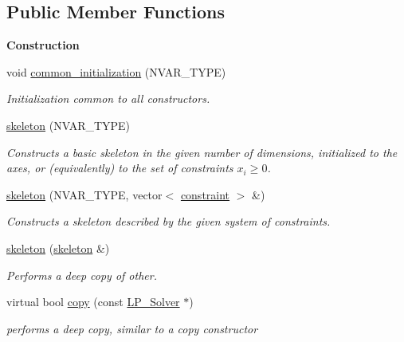 \subsection*{Public Member Functions}
\begin{Indent}\textbf{ Construction}\par
\begin{DoxyCompactItemize}
\item 
\mbox{\label{classskeleton_a7a9181253fc3b9f7b61871047b2b31cc}} 
void \hyperlink{classskeleton_a7a9181253fc3b9f7b61871047b2b31cc}{common\+\_\+initialization} (N\+V\+A\+R\+\_\+\+T\+Y\+PE)
\begin{DoxyCompactList}\small\item\em Initialization common to all constructors. \end{DoxyCompactList}\item 
\hyperlink{classskeleton_a60f5818e984abe589ea8298d189cd9c6}{skeleton} (N\+V\+A\+R\+\_\+\+T\+Y\+PE)
\begin{DoxyCompactList}\small\item\em Constructs a basic skeleton in the given number of dimensions, initialized to the axes, or (equivalently) to the set of constraints $ x_i \geq 0 $. \end{DoxyCompactList}\item 
\hyperlink{classskeleton_a5d0ebc69ae4ff20afd3096e36b31ab1f}{skeleton} (N\+V\+A\+R\+\_\+\+T\+Y\+PE, vector$<$ \hyperlink{classconstraint}{constraint} $>$ \&)
\begin{DoxyCompactList}\small\item\em Constructs a skeleton described by the given system of constraints. \end{DoxyCompactList}\item 
\mbox{\label{classskeleton_abbb0828dc5cd38edf09093e738510d7a}} 
\hyperlink{classskeleton_abbb0828dc5cd38edf09093e738510d7a}{skeleton} (\hyperlink{classskeleton}{skeleton} \&)
\begin{DoxyCompactList}\small\item\em Performs a deep copy of {\ttfamily other}. \end{DoxyCompactList}\item 
virtual bool \hyperlink{classskeleton_a42d30b92f27936eab11d0fa4f0cc10b4}{copy} (const \hyperlink{class_l_p___solver}{L\+P\+\_\+\+Solver} $\ast$)
\begin{DoxyCompactList}\small\item\em performs a deep copy, similar to a copy constructor \end{DoxyCompactList}\end{DoxyCompactItemize}
\end{Indent}
